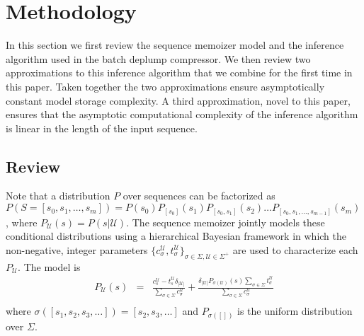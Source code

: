 \section{Methodology}
\newcommand{\T}{\ensuremath{\mathcal{T}}}
\newcommand{\N}{\ensuremath{\mathcal{N}}}
\newcommand{\M}{\ensuremath{\mathcal{M}}}
\newcommand{\PP}{\ensuremath{\mathcal{P}}}
\newcommand{\nc}{\ensuremath{nc}}
\newcommand{\RS}{\ensuremath{\mathcal{R}}}
\newcommand{\D}{\ensuremath{\mathcal{D}}}
\newcommand{\la}{\ensuremath{\leftarrow}}
\newcommand{\G}{\ensuremath{\mathcal{G}}}
\newcommand{\IS}{\ensuremath{\mathcal{I}}}
\newcommand{\Seq}{\ensuremath{\mathcal{S}}}
\newcommand{\dd}{\ensuremath{\delta}}
\newcommand{\U}{\mathcal{U}}
\label{section:methodology}



In this section we first review the sequence memoizer model and the inference algorithm used in the batch deplump compressor. We then review two approximations to this inference algorithm that we combine for the first time in this paper.  Taken together the two approximations ensure asymptotically constant model storage complexity.  A third approximation, novel to this paper, ensures that the asymptotic computational complexity of the inference algorithm is linear in the length of the input sequence.

\subsection{Review}

Note that a distribution $P$ over sequences can be factorized as $P(S = [s_0, s_1, \ldots, s_m]) = P(s_0)P_{[s_0]}(s_1)P_{[s_0,s_1]}(s_2) \ldots P_{[s_0,s_1,\ldots,s_{m-1}]}(s_m)$, where $P_\U (s) = P(s | \U)$.  The sequence memoizer \citep{Wood2009} jointly models these conditional distributions using a hierarchical Bayesian framework in which the non-negative, integer parameters $\{ c^\U_\sigma, t^\U_\sigma \}_{\sigma \in \Sigma, \U \in \Sigma^{+}}$ are used to characterize each $P_\U$.  The model is
%
\begin{eqnarray*}
	P_\U(s) &=& \frac{c^\U_s - t^\U_s \delta_{|\U|} }{\sum_{\sigma \in \Sigma} c^\U_\sigma} +  \frac{\delta_{|\U|} P_{ \sigma(\U)}(s) \sum_{\sigma \in \Sigma} t^\U_\sigma}{\sum_{\sigma \in \Sigma} c^\U_\sigma} \\
\end{eqnarray*}
%
\noindent where $\sigma([s_1, s_2, s_3, \ldots]) = [s_2,s_3, \ldots]$ and $P_{\sigma([])}$ is the uniform distribution over $\Sigma$.

